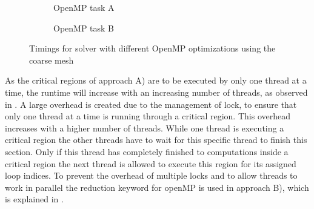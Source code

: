 \begin{figure}[h!]
	\centering
	\begin{subfigure}[h!]{.49\textwidth}
		\centering
		\caption{\label{fig::OpenMPA} OpenMP task A}
	\end{subfigure}
	\hfill
	\begin{subfigure}[h!]{.49\textwidth}
		\centering
		\caption{\label{fig::OpenMPB} OpenMP task B}
	\end{subfigure}
	\caption{\label{fig::OpenMP1} Timings for solver with different OpenMP optimizations using the coarse mesh}
\end{figure}

As the critical regions of approach A) are to be executed by only one thread at a time, the runtime will increase with an increasing number of threads, as observed in . A large overhead is created due to the management of lock, to ensure that only one thread at a time is running through a critical region. This overhead increases with a higher number of threads. While one thread is executing a critical region the other threads have to wait for this specific thread to finish this section. Only if this thread has completely finished to computations inside a critical region the next thread is allowed to execute this region for its assigned loop indices. To prevent the overhead of multiple locks and to allow threads to work in parallel the reduction keyword for openMP is used in approach B), which is explained in . 

